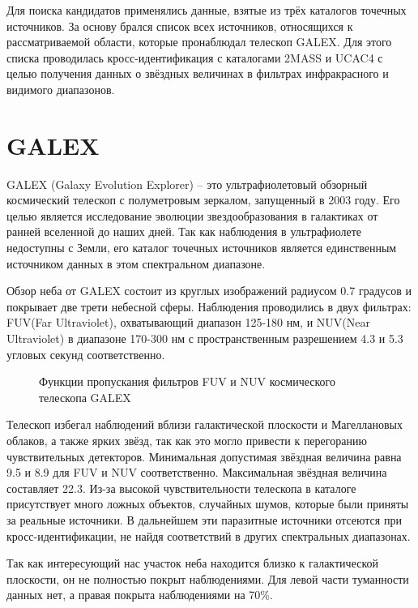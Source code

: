 Для поиска кандидатов применялись данные, взятые из трёх каталогов точечных источников. За основу брался список всех источников, относящихся к рассматриваемой области, которые пронаблюдал телескоп GALEX.
Для этого списка проводилась кросс-идентификация с каталогами 2MASS и UCAC4 с целью получения данных о звёздных величинах в фильтрах инфракрасного и видимого диапазонов. 


\section{GALEX}
GALEX (Galaxy Evolution Explorer) -- это ультрафиолетовый обзорный космический телескоп с полуметровым зеркалом, запущенный в 2003 году. Его целью является исследование эволюции звездообразования в галактиках от ранней вселенной до наших дней. Так как наблюдения в ультрафиолете недоступны с Земли, его каталог точечных источников является единственным источником данных в этом спектральном диапазоне.

Обзор неба от GALEX состоит из круглых изображений радиусом 0.7 градусов и покрывает две трети небесной сферы. Наблюдения проводились в двух фильтрах: FUV(Far Ultraviolet), охватывающий диапазон 125-180 нм, и NUV(Near Ultraviolet) в диапазоне 170-300 нм с пространственным разрешением 4.3 и 5.3 угловых секунд соответственно.


\begin{figure}[h]
\hfill
\caption{Функции пропускания фильтров FUV и NUV космического телескопа GALEX}
\label{fig:filters}
\end{figure}

Телескоп избегал наблюдений вблизи галактической плоскости и Магеллановых облаков, а также ярких звёзд, так как это могло привести к перегоранию чувствительных детекторов. Минимальная допустимая звёздная величина равна 9.5 и 8.9 для FUV и NUV соответственно. Максимальная звёздная величина составляет 22.3. Из-за высокой чувствительности телескопа в каталоге присутствует много ложных объектов, случайных шумов, которые были приняты за реальные источники. В дальнейшем эти паразитные источники отсеются при кросс-идентификации, не найдя соответствий в других спектральных диапазонах.

Так как интересующий нас участок неба находится близко к галактической плоскости, он не полностью покрыт наблюдениями. Для левой части туманности данных нет, а правая покрыта наблюдениями на 70\%.

